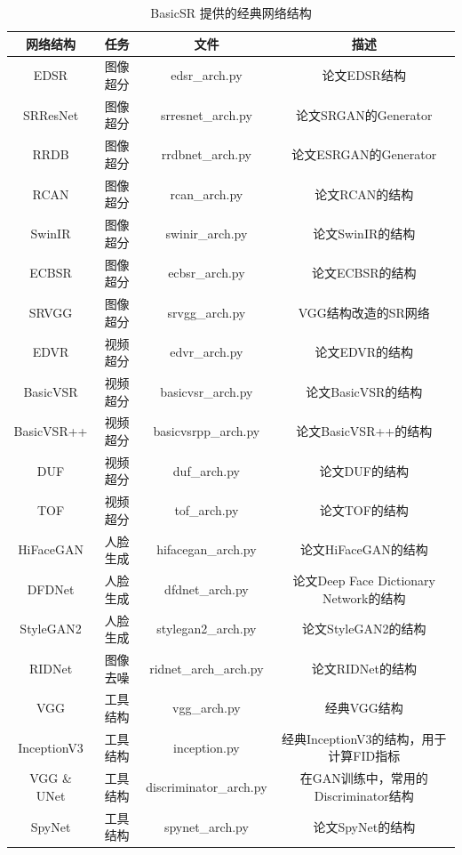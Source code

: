 \documentclass[../main.tex]{subfiles}
\begin{document}
	\begin{table}[h]
    \centering
    {
    \begin{tabular}{|c|c|c|c|}
    \hline
    \textbf{网络结构} & \textbf{任务} & \textbf{文件} & \textbf{描述} \\ \hline
    EDSR & 图像超分 & edsr\_arch.py & 论文EDSR结构 \\ \hline
    SRResNet & 图像超分 & srresnet\_arch.py & 论文SRGAN的Generator \\ \hline
    RRDB & 图像超分 & rrdbnet\_arch.py & 论文ESRGAN的Generator \\ \hline
    RCAN & 图像超分 & rcan\_arch.py & 论文RCAN的结构 \\ \hline
    SwinIR & 图像超分 & swinir\_arch.py & 论文SwinIR的结构 \\ \hline
    ECBSR & 图像超分 & ecbsr\_arch.py & 论文ECBSR的结构 \\ \hline
    SRVGG & 图像超分 & srvgg\_arch.py & VGG结构改造的SR网络 \\ \hline
    EDVR & 视频超分 & edvr\_arch.py & 论文EDVR的结构 \\ \hline
    BasicVSR & 视频超分 & basicvsr\_arch.py &  论文BasicVSR的结构\\ \hline
    BasicVSR++ & 视频超分 & basicvsrpp\_arch.py &  论文BasicVSR++的结构\\ \hline
    DUF & 视频超分 & duf\_arch.py &  论文DUF的结构\\ \hline
    TOF & 视频超分 & tof\_arch.py &  论文TOF的结构\\ \hline
    HiFaceGAN & 人脸生成 & hifacegan\_arch.py &  论文HiFaceGAN的结构\\ \hline
    DFDNet & 人脸生成 & dfdnet\_arch.py &  论文Deep Face Dictionary Network的结构\\ \hline
    StyleGAN2  & 人脸生成 & stylegan2\_arch.py &  论文StyleGAN2的结构 \\ \hline
    RIDNet  & 图像去噪 & ridnet\_arch\_arch.py &  论文RIDNet的结构 \\ \hline
    VGG  & 工具结构 & vgg\_arch.py &  经典VGG结构 \\ \hline
    InceptionV3  & 工具结构 & inception.py &  经典InceptionV3的结构，用于计算FID指标 \\ \hline
    VGG \& UNet  & 工具结构 & discriminator\_arch.py &  在GAN训练中，常用的Discriminator结构 \\ \hline
    SpyNet  & 工具结构 & spynet\_arch.py &  论文SpyNet的结构 \\ \hline
    \end{tabular}
    }
    \caption{BasicSR 提供的经典网络结构}
    \end{table}
    
\end{document}
